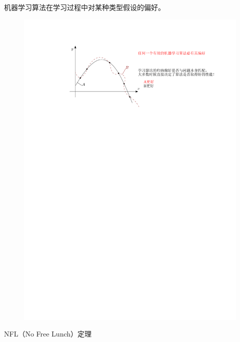 机器学习算法在学习过程中对某种类型假设的偏好。
\begin{figure}[htbp]
    \centering
    \includegraphics{image/归纳偏好.pdf}
\end{figure}

\textcolor{main1}{NFL（No Free Lunch）定理}

